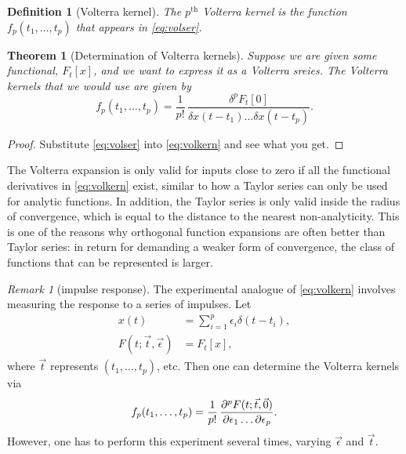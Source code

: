 \documentclass[12pt]{article}
\theoremstyle{slplain}
\newtheorem{thm}{Theorem}
\theoremstyle{sldefinition}
\newtheorem{defn}{Definition}
\theoremstyle{remark}
\newtheorem*{rem}{Remark}
\begin{document}
\begin{defn}[Volterra kernel]
  The $p^{\text{th}}$ Volterra kernel is the function $f_p(t_1,\ldots,t_p)$ that appears in \eqref{eq:volser}.
\end{defn}

\begin{thm}[Determination of Volterra kernels]
  Suppose we are given some functional, $F_t[x]$, and we want to express it as a Volterra sreies. The Volterra kernels that we would use are given by
  \begin{equation}\label{eq:volkern}
    f_p(t_1,\ldots,t_p) = \frac{1}{p!}\, \frac{\delta^p F_t[0]}{\delta x(t-t_1) \ldots \delta x(t-t_p)}.
  \end{equation}
\end{thm}
\begin{proof}
  Substitute \eqref{eq:volser} into \eqref{eq:volkern} and see what you get.
\end{proof}

The Volterra expansion is only valid for inputs close to zero if all the functional derivatives in \eqref{eq:volkern} exist, similar to how a Taylor series can only be used for analytic functions. In addition, the Taylor series is only valid inside the radius of convergence, which is equal to the distance to the nearest non-analyticity. This is one of the reasons why orthogonal function expansions are often better than Taylor series: in return for demanding a weaker form of convergence, the class of functions that can be represented is larger.


\begin{rem}[impulse response]
  The experimental analogue of \eqref{eq:volkern} involves measuring the response to a series of impulses. Let 
  \begin{equation}\label{eq:imulses}
  \begin{aligned}
    x(t) &= \sum_{i=1}^p \epsilon_i \delta(t-t_i), \\
    F(t;\vec{t},\vec{\epsilon} ) &= F_t[x],
  \end{aligned}
  \end{equation}
  where $\vec{t}$ represents $(t_1,\ldots,t_p)$, etc. Then one can determine the Volterra kernels via
  \begin{equation}\label{eq:impkern}
    f_p(t_1,\ldots,t_p) = \frac{1}{p!}\, \frac{\partial^p F(t;\vec{t},\vec{0})}{\partial\epsilon_1\ldots\partial\epsilon_p}.
  \end{equation}
  However, one has to perform this experiment several times, varying $\vec{\epsilon}$ and $\vec{t}$.
\end{rem}
\end{document}
